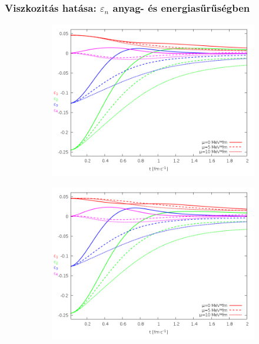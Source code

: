 \documentclass{beamer}
\begin{document}
\begin{frame}[noframenumbering]
\frametitle{Viszkozitás hatása: $\varepsilon_n$ anyag- és energiasűrűségben}
\begin{center}
\begin{figure}[H]
	\centering
    \begin{subfigure}[b]{0.49\textwidth}
    		\includegraphics[width=\textwidth]{pic/res/nonrel/eps_visc_r}
	\end{subfigure}
	\begin{subfigure}[b]{0.49\textwidth}
        	\includegraphics[width=\textwidth]{pic/res/nonrel/eps_visc_p}
	\end{subfigure}
\end{figure}
\end{center}
\end{frame}
\end{document}
